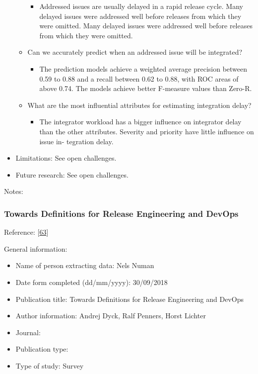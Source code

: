 \documentclass[]{book}
\providecommand{\tightlist}{%
  \setlength{\itemsep}{0pt}\setlength{\parskip}{0pt}}
\begin{document}
\begin{itemize}
\begin{itemize}
    \begin{itemize}
    \tightlist
    \item
      Addressed issues are usually delayed in a rapid release cycle.
      Many delayed issues were addressed well before releases from which
      they were omitted. Many delayed issues were addressed well before
      releases from which they were omitted.
    \end{itemize}
  \item
    Can we accurately predict when an addressed issue will be
    integrated?

    \begin{itemize}
    \tightlist
    \item
      The prediction models achieve a weighted average precision between
      0.59 to 0.88 and a recall between 0.62 to 0.88, with ROC areas of
      above 0.74. The models achieve better F-measure values than
      Zero-R.
    \end{itemize}
  \item
    What are the most influential attributes for estimating integration
    delay?

    \begin{itemize}
    \tightlist
    \item
      The integrator workload has a bigger influence on integrator delay
      than the other attributes. Severity and priority have little
      influence on issue in- tegration delay.
    \end{itemize}
  \end{itemize}
\item
  Limitations: See open challenges.
\item
  Future research: See open challenges.
\end{itemize}

Notes:

\subsubsection{Towards Definitions for Release Engineering and
DevOps}\label{towards-definitions-for-release-engineering-and-devops}

Reference: {[}\protect\hyperlink{ref-dyck2015a}{63}{]}

General information:

\begin{itemize}
\tightlist
\item
  Name of person extracting data: Nels Numan
\item
  Date form completed (dd/mm/yyyy): 30/09/2018
\item
  Publication title: Towards Definitions for Release Engineering and
  DevOps
\item
  Author information: Andrej Dyck, Ralf Penners, Horst Lichter
\item
  Journal:
\item
  Publication type:
\item
  Type of study: Survey
\end{itemize}
\end{document}
